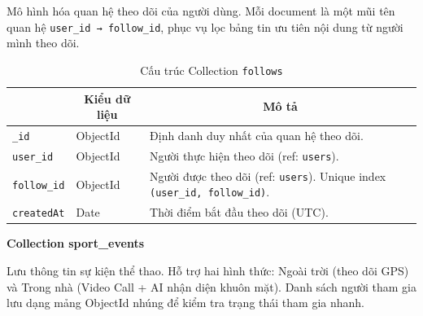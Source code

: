 Mô hình hóa quan hệ theo dõi của người dùng. Mỗi document là một mũi tên quan hệ \texttt{user\_id → follow\_id}, phục vụ lọc bảng tin ưu tiên nội dung từ người mình theo dõi.

\begin{table}[H]
\centering
\footnotesize
\setlength{\tabcolsep}{5pt}
\renewcommand{\arraystretch}{1.15}
\begin{tabularx}{\textwidth}{|p{3.6cm}|p{2.6cm}|X|}
\hline
\rowcolor{dbheadblue}
\multicolumn{1}{|c|}{\color{white}\textbf{Trường}} &
\multicolumn{1}{c|}{\color{white}\textbf{Kiểu dữ liệu}} &
\multicolumn{1}{c|}{\color{white}\textbf{Mô tả}} \\
\hline
\texttt{\_id}        & ObjectId & Định danh duy nhất của quan hệ theo dõi. \\ \hline
\rowcolor{dbrowalt}
\texttt{user\_id}    & ObjectId & Người thực hiện theo dõi (ref: \texttt{users}). \\ \hline
\texttt{follow\_id}  & ObjectId & Người được theo dõi (ref: \texttt{users}). Unique index \texttt{(user\_id, follow\_id)}. \\ \hline
\rowcolor{dbrowalt}
\texttt{createdAt}  & Date     & Thời điểm bắt đầu theo dõi (UTC). \\ \hline
\end{tabularx}
\caption{Cấu trúc Collection \texttt{follows}}
\label{tab:col_follows}
\end{table}

\textbf{Collection sport\_events}
\label{subsec:col_sport_events}

Lưu thông tin sự kiện thể thao. Hỗ trợ hai hình thức: Ngoài trời (theo dõi GPS) và Trong nhà (Video Call + AI nhận diện khuôn mặt). Danh sách người tham gia lưu dạng mảng ObjectId nhúng để kiểm tra trạng thái tham gia nhanh.

